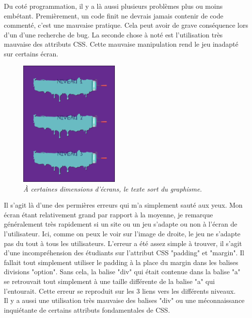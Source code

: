 \documentclass{article}
\begin{document}
\hspace*{0.6cm}Du cot\'e programmation, il y a l\`a aussi plusieurs probl\`emes plus ou moins emb\'etant. Premi\`erement, un code finit ne devrais jamais contenir de code comment\'e, c'est une mauvaise pratique. Cela peut avoir de grave cons\'equence lors d'un d'une recherche de bug. La seconde chose \`a not\'e est l'utilisation tr\`es mauvaise des attributs CSS. Cette mauvaise manipulation rend le jeu inadapt\'e sur certains \'ecran.\\
\begin{figure}
\vspace{-13pt}
\centering
\includegraphics[width=5cm]{1}
\caption{\textit{\`A certaines dimensions d'\'ecrans, le texte sort du graphisme.}}
\end{figure}
{\hspace*{0.6cm}Il s'agit l\`a d'une des permi\`eres erreurs qui m'a simplement saut\'e aux yeux. Mon \'ecran \'etant relativement grand par rapport \`a la moyenne, je remarque g\'en\'eralement tr\`es rapidement si un site ou un jeu s'adapte ou non \`a l'\'ecran de l'utilisateur. Ici, comme on peux le voir sur l'image de droite, le jeu ne s'adapte pas du tout \`a tous les utilisateurs. L'erreur a \'et\'e assez simple \`a trouver, il s'agit d'une incompr\'ehension des \'etudiants sur l'attribut CSS "padding" et "margin". Il fallait tout simplement utiliser le padding \`a la place du margin dans les balises divisions "option". Sans cela, la balise "div" qui \'etait contenue dans la balise "a" se retrouvait tout simplement \`a une taille diff\'erente de la balise "a" qui l'entourait. Cette erreur se reproduit sur les 3 liens vers les diff\'erents niveaux.}\\

Il y a aussi une utilisation tr\`es mauvaise des balises "div" ou une m\'econnaissance inqui\'etante de certains attributs fondamentales de CSS.\\
\end{document}
